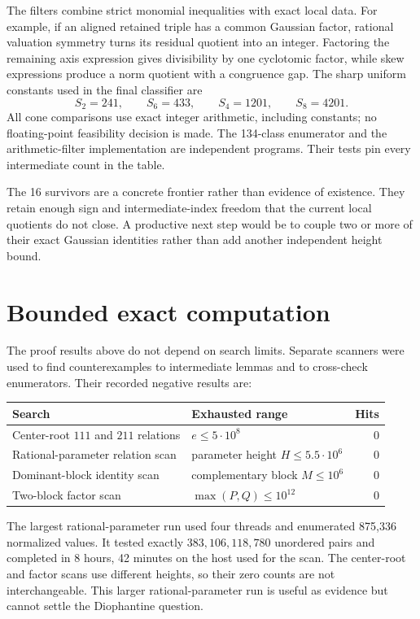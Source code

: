 \documentclass[11pt]{article}
\theoremstyle{definition}
\theoremstyle{remark}
\begin{document}
The filters combine strict monomial inequalities with exact local data.  For
example, if an aligned retained triple has a common Gaussian factor, rational
valuation symmetry turns its residual quotient into an integer.  Factoring
the remaining axis expression gives divisibility by one cyclotomic factor,
while skew expressions produce a norm quotient with a congruence gap.  The
sharp uniform constants used in the final classifier are
\begin{equation}
S_2=241,\qquad S_6=433,\qquad S_4=1201,\qquad S_8=4201.
\end{equation}
All cone comparisons use exact integer arithmetic, including constants; no
floating-point feasibility decision is made.  The 134-class enumerator and
the arithmetic-filter implementation are independent programs.  Their tests
pin every intermediate count in the table.

The 16 survivors are a concrete frontier rather than evidence of existence.
They retain enough sign and intermediate-index freedom that the current local
quotients do not close.  A productive next step would be to couple two or more
of their exact Gaussian identities rather than add another independent height
bound.

\section{Bounded exact computation}

The proof results above do not depend on search limits.  Separate scanners
were used to find counterexamples to intermediate lemmas and to cross-check
enumerators.  Their recorded negative results are:
\begin{center}
\begin{tabular}{@{}p{}p{}r@{}}
\toprule
Search & Exhausted range & Hits \\
\midrule
Center-root $111$ and $211$ relations & $e\le 5\cdot10^8$ & 0 \\
Rational-parameter relation scan & parameter height $H\le5.5\cdot10^6$ & 0 \\
Dominant-block identity scan & complementary block $M\le10^6$ & 0 \\
Two-block factor scan & $\max(P,Q)\le10^{12}$ & 0 \\
\bottomrule
\end{tabular}
\end{center}
The largest rational-parameter run used four threads and enumerated 875,336
normalized values.  It tested exactly $383{,}106{,}118{,}780$ unordered pairs
and completed in 8 hours, 42 minutes on the host used for the scan.  The
center-root and factor scans use different heights, so their zero counts are
not interchangeable.  This larger rational-parameter run is useful as
evidence but cannot settle the Diophantine question.
\end{document}
